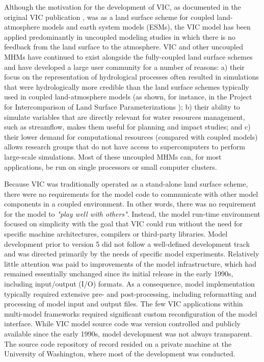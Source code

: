 \documentclass[gmd, manuscript]{copernicus}
\begin{document}
  Although the motivation for the development of VIC, as documented in the original VIC publication \citep{Liang_1994}, was as a land surface scheme for coupled land-atmosphere models and earth system models (ESMs), the VIC model has been applied predominantly in uncoupled modeling studies in which there is no feedback from the land surface to the atmosphere. VIC and other uncoupled MHMs have continued to exist alongside the fully-coupled land surface schemes and have developed a large user community for a number of reasons: a) their focus on the representation of hydrological processes often resulted in simulations that were hydrologically more credible than the land surface schemes typically used in coupled land-atmosphere models (as shown, for instance, in the Project for Intercomparison of Land Surface Parameterizations \citep[PILPS;][]{Bowling_2003,wood_1998}); b) their ability to simulate variables that are directly relevant for water resources management, such as streamflow, makes them useful for planning and impact studies; and c) their lower demand for computational resources (compared with coupled models) allows research groups that do not have access to supercomputers to perform large-scale simulations. Most of these uncoupled MHMs can, for most applications, be run on single processors or small computer clusters.

  Because VIC was traditionally operated as a stand-alone land surface scheme, there were no requirements for the model code to communicate with other model components in a coupled environment. In other words, there was no requirement for the model to \textit{"play well with others"}. Instead, the model run-time environment focused on simplicity with the goal that VIC could run without the need for specific machine architectures, compilers or third-party libraries. Model development prior to version 5 did not follow a well-defined development track and was directed primarily by the needs of specific model experiments. Relatively little attention was paid to improvements of the model infrastructure, which had remained essentially unchanged since its initial release in the early 1990s, including input/output (I/O) formats. As a consequence, model implementation typically required extensive pre- and post-processing, including reformatting and processing of model input and output files. The few VIC applications within multi-model frameworks \citep[e.g. NASA LIS, ][]{Kumar_2006} required significant custom reconfiguration of the model interface. While VIC model source code was version controlled and publicly available since the early 1990s, model development was not always transparent. The source code repository of record resided on a private machine at the University of Washington, where most of the development was conducted.
\end{document}
